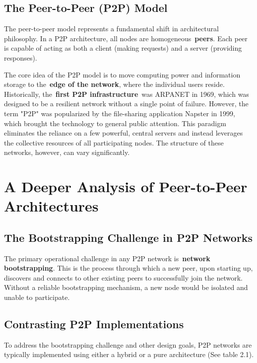 \documentclass{scrbook}
\begin{document}
\subsection{The Peer-to-Peer (P2P) Model}

The peer-to-peer model represents a fundamental shift in architectural
philosophy. In a P2P architecture, all nodes are
homogeneous~\textbf{peers}. Each peer is capable of acting as both a
client (making requests) and a server (providing responses).

The core idea of the P2P model is to move computing power and
information storage to the~\textbf{edge of the network}, where the
individual users reside. Historically, the~\textbf{first P2P
infrastructure}~was ARPANET in 1969, which was designed to be a
resilient network without a single point of failure. However, the term
"P2P" was popularized by the file-sharing application Napster in 1999,
which brought the technology to general public attention. This paradigm
eliminates the reliance on a few powerful, central servers and instead
leverages the collective resources of all participating nodes. The
structure of these networks, however, can vary significantly.

\section{A Deeper Analysis of Peer-to-Peer Architectures}

\subsection{The Bootstrapping Challenge in P2P Networks}

The primary operational challenge in any P2P network is~\textbf{network
bootstrapping}. This is the process through which a new peer, upon
starting up, discovers and connects to other existing peers to
successfully join the network. Without a reliable bootstrapping
mechanism, a new node would be isolated and unable to participate.

\subsection{Contrasting P2P Implementations}

To address the bootstrapping challenge and other design goals, P2P
networks are typically implemented using either a hybrid or a pure
architecture (See table 2.1).
\end{document}
